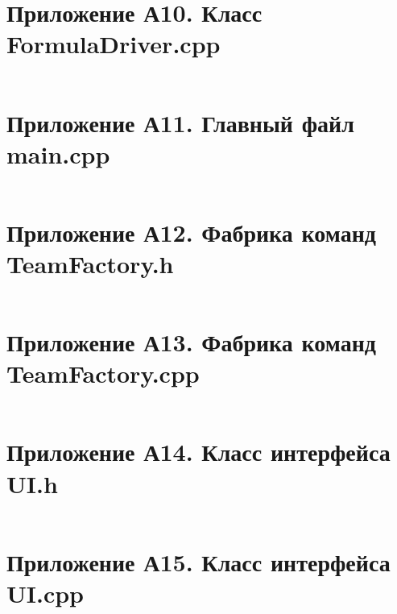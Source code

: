 \documentclass[oneside,a4paper,14pt]{extarticle}
\begin{document}
\section*{Приложение А10. Класс FormulaDriver.cpp}
\inputminted{cpp}{code/src/core/FormulaDriver.cpp}

\section*{Приложение А11. Главный файл main.cpp}
\inputminted{cpp}{code/src/main.cpp}

\section*{Приложение А12. Фабрика команд TeamFactory.h}
\inputminted{cpp}{code/src/core/TeamFactory.h}

\section*{Приложение А13. Фабрика команд TeamFactory.cpp}
\inputminted{cpp}{code/src/core/TeamFactory.cpp}

\section*{Приложение А14. Класс интерфейса UI.h}
\inputminted{cpp}{code/src/ui/UI.h}

\section*{Приложение А15. Класс интерфейса UI.cpp}
\inputminted{cpp}{code/src/ui/UI.cpp}
\end{document}

